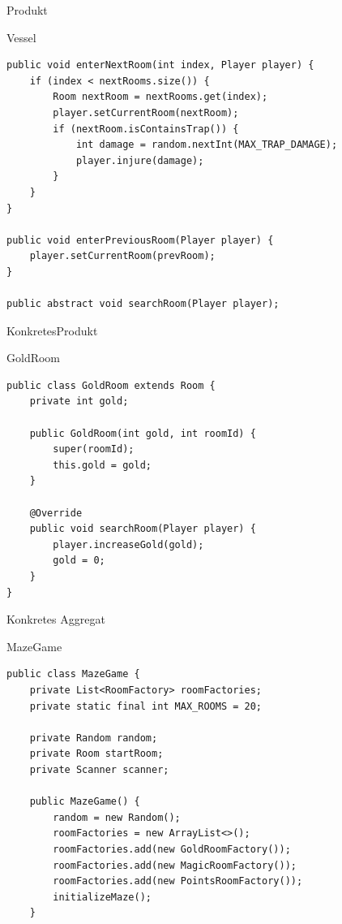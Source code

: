 \begin{frame}[fragile]{Produkt}
	\begin{exampleblock}{Vessel}
 		\begin{lstlisting}
public void enterNextRoom(int index, Player player) {
    if (index < nextRooms.size()) {
        Room nextRoom = nextRooms.get(index);
        player.setCurrentRoom(nextRoom);
        if (nextRoom.isContainsTrap()) {
            int damage = random.nextInt(MAX_TRAP_DAMAGE);
            player.injure(damage);
        }
    }
}

public void enterPreviousRoom(Player player) {
    player.setCurrentRoom(prevRoom);
}

public abstract void searchRoom(Player player);   
 		\end{lstlisting}
 	\end{exampleblock}
\end{frame}

\begin{frame}[fragile]{KonkretesProdukt}
	\begin{exampleblock}{GoldRoom}
 		\begin{lstlisting}
public class GoldRoom extends Room {
	private int gold;
	
	public GoldRoom(int gold, int roomId) {
		super(roomId);
		this.gold = gold;
	}

	@Override
	public void searchRoom(Player player) {
		player.increaseGold(gold);
		gold = 0;
	}
}
 		\end{lstlisting}
 	\end{exampleblock}
\end{frame}

\begin{frame}[fragile]{Konkretes Aggregat}
	\begin{exampleblock}{MazeGame}
 		\begin{lstlisting}
public class MazeGame {
	private List<RoomFactory> roomFactories;
	private static final int MAX_ROOMS = 20;
	
	private Random random;
	private Room startRoom;
	private Scanner scanner;
	
	public MazeGame() {
		random = new Random();
		roomFactories = new ArrayList<>();
		roomFactories.add(new GoldRoomFactory());
		roomFactories.add(new MagicRoomFactory());
		roomFactories.add(new PointsRoomFactory());
		initializeMaze();
	}
 		\end{lstlisting}
 	\end{exampleblock}
\end{frame}

